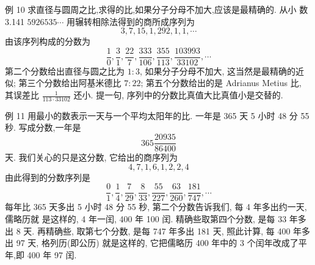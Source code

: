 例 10 求直径与圆周之比,求得的比,如果分子分母不加大,应该是最精确的. 从小 数 3.141 $5926535 \cdots$ 用辗转相除法得到的商所成序列为
\[
3,7,15,1,292,1,1, \cdots
\]
由该序列构成的分数为
\[
\frac{1}{0}, \frac{3}{1}, \frac{22}{7}, \frac{333}{106}, \frac{355}{113}, \frac{103993}{33102}, \cdots
\]
第二个分数给出直径与圆之比为 $1: 3$, 如果分子分母不加大, 这当然是最精确的近似; 第三个分数给出阿基米德比 $7: 22$; 第五个分数给出的是 Adrianus Metius 比, 其误差比 $\frac{1}{113 \cdot 33102}$ 还小. 提一句, 序列中的分数比真值大比真值小是交替的.

例 11 用最小的数表示一天与一个平均太阳年的比. 一年是 365 天 5 小时 48 分 55 秒. 写成分数,一年是
\[
365 \frac{20935}{86400}
\]
天. 我们关心的只是这分数, 它给出的商序列为
\[
4,7,1,6,1,2,2,4
\]
由此得到的分数序列是
\[
\frac{0}{1}, \frac{1}{4}, \frac{7}{29}, \frac{8}{33}, \frac{55}{227}, \frac{63}{260}, \frac{181}{747}, \cdots
\]
每年比 365 天多出 5 小时 48 分 55 秒, 第二个分数告诉我们, 每 4 年多出约一天, 儒略历就 是这样的, 4 年一闰, 400 年 100 闰. 精确些取第四个分数, 是每 33 年多出 8 天. 再精确些, 取第七个分数, 是每 747 年多出 181 天, 照此计算, 每 400 年多出 97 天, 格列历(即公历) 就是这样的, 它把儒略历 400 年中的 3 个闰年改成了平年,即 400 年 97 闰.

